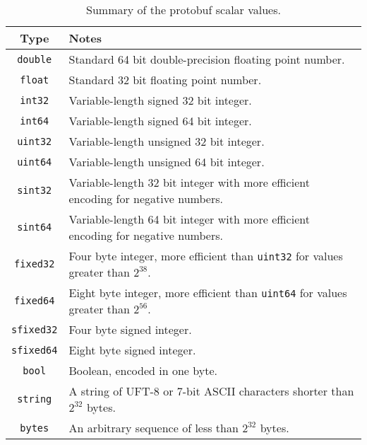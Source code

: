 \documentclass[11pt]{article}
\theoremstyle{definition}
\begin{document}
\begin{table}[H]
	\centering
	\begin{tabular}{cl}
		\toprule
		Type              & Notes                                                    \\
		\midrule
		\texttt{double}   & Standard 64 bit double-precision floating point
		number.                                                                      \\
		\texttt{float}    & Standard 32 bit floating point number.                   \\
		\texttt{int32}    & Variable-length signed 32 bit integer.                   \\
		\texttt{int64}    & Variable-length signed 64 bit integer.                   \\
		\texttt{uint32}   & Variable-length unsigned 32 bit integer.                 \\
		\texttt{uint64}   & Variable-length unsigned 64 bit integer.                 \\
		\texttt{sint32}   & Variable-length 32 bit integer with more
		efficient encoding for negative numbers.                                     \\
		\texttt{sint64}   & Variable-length 64 bit integer with more efficient
		encoding for negative numbers.                                               \\
		\texttt{fixed32}  & Four byte integer, more efficient than \texttt{uint32}
		for values greater than $2^{38}$.                                            \\
		\texttt{fixed64}  & Eight byte integer, more efficient than \texttt{uint64}
		for values greater than $2^{56}$.                                            \\
		\texttt{sfixed32} & Four byte signed integer.                                \\
		\texttt{sfixed64} & Eight byte signed integer.                               \\
		\texttt{bool}     & Boolean, encoded in one byte.                            \\
		\texttt{string}   & A string of UFT-8 or 7-bit ASCII characters shorter than
		$2^{32}$ bytes.                                                              \\
		\texttt{bytes}    & An arbitrary sequence of less than $2^{32}$ bytes.       \\
		\bottomrule
	\end{tabular}
	\caption{Summary of the protobuf scalar values.}
	\label{tbl:proto-prim}
\end{table}
\end{document}
